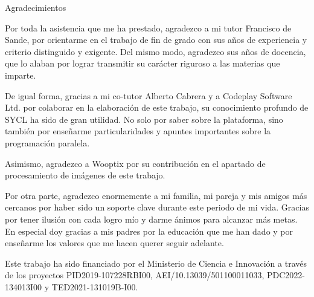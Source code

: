 \documentclass[english,a4paper,12pt,oneside]{extreport}
\begin{document}
{ \flushright

\begin{LARGE}
Agradecimientos
\end{LARGE}

\hspace{3mm}

\begin{large}


\hspace{3mm}

\hspace{3mm}
Por toda la asistencia que me ha prestado, agradezco a mi tutor Francisco de Sande, por orientarme en el trabajo de fin de grado con sus años de experiencia y criterio distinguido y exigente. Del mismo modo, agradezco sus años de docencia, que lo alaban por lograr transmitir su carácter riguroso a las materias que imparte.

\vspace{5mm}

De igual forma, gracias a mi co-tutor Alberto Cabrera y a Codeplay Software Ltd. por colaborar en la elaboración de este trabajo, su conocimiento profundo de SYCL ha sido de gran utilidad. No solo por saber sobre la plataforma, sino también por enseñarme particularidades y apuntes importantes sobre la programación paralela.

\vspace{5mm}

Asimismo, agradezco a Wooptix por su contribución en el apartado de procesamiento de imágenes de este trabajo.

\vspace{5mm}

Por otra parte, agradezco enormemente a mi familia, mi pareja y mis amigos más cercanos por haber sido un soporte clave durante este periodo de mi vida. Gracias por tener ilusión con cada logro mío y darme ánimos para alcanzar más metas. En especial doy gracias a mis padres por la educación que me han dado y por enseñarme los valores que me hacen querer seguir adelante.

\vspace{5mm}

Este trabajo ha sido financiado por el Ministerio de Ciencia e Innovación a través de los proyectos PID2019-107228RBI00, AEI/10.13039/501100011033, PDC2022-134013I00 y TED2021-131019B-I00.
\end{large}

}

\newpage
\end{document}

